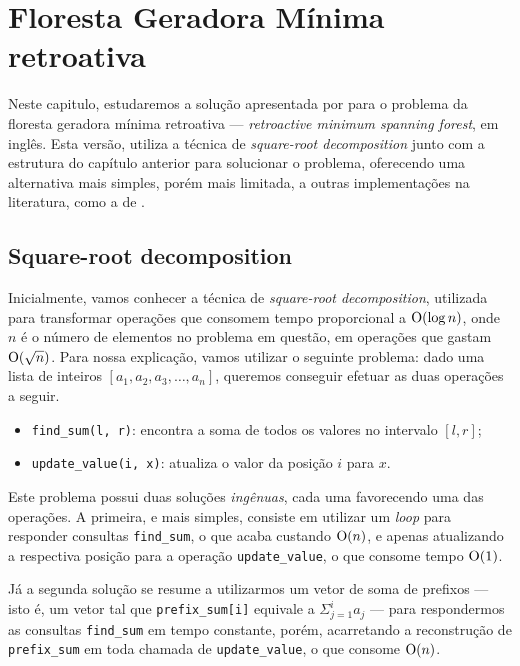 
\chapter{Floresta Geradora Mínima retroativa}
\label{cap:retroactive-msf}

Neste capitulo, estudaremos a solução apresentada por \citet{10.1093/comjnl/bxaa135} para o problema da floresta geradora mínima retroativa --- \emph{retroactive minimum spanning forest}, em inglês. Esta versão, utiliza a técnica de \emph{square-root decomposition} junto com a estrutura do capítulo anterior para solucionar o problema, oferecendo uma alternativa mais simples, porém mais limitada, a outras implementações na literatura, como a de \citet{10.1145/502090.502095}.

\section{Square-root decomposition}
\label{sec:sqrt-decomp}

Inicialmente, vamos conhecer a técnica de \emph{square-root decomposition}, utilizada para transformar operações que consomem tempo proporcional a $\mathrm{O}(\log n)$, onde $n$ é o número de elementos no problema em questão, em operações que gastam $\mathrm{O}(\sqrt{n})$. Para nossa explicação, vamos utilizar o seguinte problema: dado uma lista de inteiros $ [ a_1, a_2, a_3, \dots, a_n ] $, queremos conseguir efetuar as duas operações a seguir.

\begin{itemize}
    \item \texttt{find\_sum(l, r)}: encontra a soma de todos os valores no intervalo $[l,r]$;
    \item \texttt{update\_value(i, x)}: atualiza o valor da posição $i$ para $x$.
\end{itemize}

Este problema possui duas soluções \emph{ingênuas}, cada uma favorecendo uma das operações. A primeira, e mais simples, consiste em utilizar um \emph{loop} para responder consultas \texttt{find\_sum}, o que acaba custando $\mathrm{O}(n)$, e apenas atualizando a respectiva posição para a operação \texttt{update\_value}, o que consome tempo $\mathrm{O}(1)$.

Já a segunda solução se resume a utilizarmos um vetor de soma de prefixos --- isto é, um vetor tal que \texttt{prefix\_sum[i]} equivale a $\Sigma_{j=1}^{i} a_j$ --- para respondermos as consultas \texttt{find\_sum} em tempo constante, porém, acarretando a reconstrução de \texttt{prefix\_sum} em toda chamada de \texttt{update\_value}, o que consome $\mathrm{O}(n)$.


